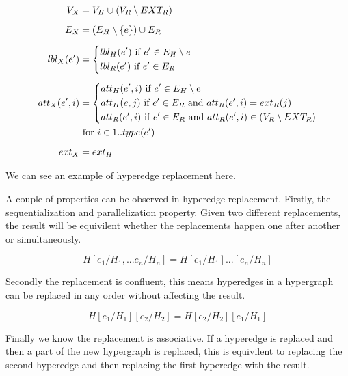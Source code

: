 
    \begin{align*}
    V_X &= V_H \cup (V_R \setminus EXT_R) \\[2mm]
    E_X &= (E_H \setminus \{e\}) \cup E_R \\[2mm]
    lbl_X(e') &= \begin{dcases*}
      lbl_H(e') \textrm{ if } e' \in E_H \setminus {e} \\
      lbl_R(e') \textrm{ if } e' \in E_R
    \end{dcases*} \\[2mm]
    att_X(e', i) &= \begin{dcases*}
      att_H(e', i) \textrm{ if } e' \in E_H \setminus {e} \\
      att_H(e, j) \textrm{ if } e' \in E_R \textrm{ and } att_R(e', i) = ext_R(j) \\
      att_R(e', i) \textrm{ if } e' \in E_R \textrm{ and } att_R(e', i) \in (V_R \setminus EXT_R)
    \end{dcases*} \\
    &\ \textrm{for } i \in 1..type(e') \\[2mm]
    ext_X &= ext_H
    \end{align*}

    We can see an example of hyperedge replacement here.
    
    

    A couple of properties can be observed in hyperedge replacement. Firstly, the sequentialization and parallelization property. Given two different replacements, the result will be equivilent whether the replacements happen one after another or simultaneously.

    \begin{equation}
    H[e_1/H_1,...e_n/H_n] = H[e_1/H_1]...[e_n/H_n]
    \end{equation}

    Secondly the replacement is confluent, this means hyperedges in a hypergraph can be replaced in any order without affecting the result.

    \begin{equation}
    H[e_1/H_1][e_2/H_2] = H[e_2/H_2][e_1/H_1]
    \end{equation}

    Finally we know the replacement is associative. If a hyperedge is replaced and then a part of the new hypergraph is replaced, this is equivilent to replacing the second hyperedge and then replacing the first hyperedge with the result.

